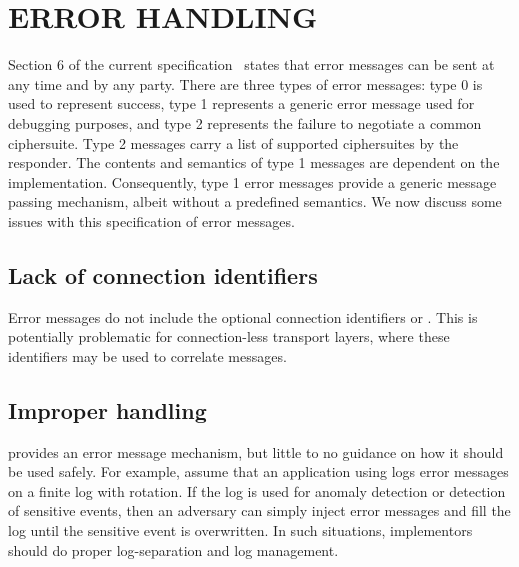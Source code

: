 \documentclass[runningheads]{llncs}
\begin{document}
\section{\uppercase{Error handling}}
\label{sec:errorHandling}
Section 6 of the current \mEdhoc{} specification~\cite{draft-ietf-lake-edhoc-15} states that error messages can be sent at any time and by any party.
%
There are three types of error messages: type 0 is used to represent success, type 1 represents a generic error message used for debugging purposes, and type 2 represents the failure to negotiate a common ciphersuite. 
%
Type 2 messages carry a list of supported ciphersuites by the responder.
%
The contents and semantics of type 1 messages are dependent on the implementation.
%
Consequently, type 1 error messages provide a generic message passing mechanism, albeit without a predefined semantics.
%
We now discuss some issues with this specification of error messages.

\subsection{Lack of connection identifiers}
Error messages do not include the optional connection identifiers \mCi{} or \mCr{}.
%
This is potentially problematic for connection-less transport layers, where these identifiers may be used to correlate messages.

\subsection{Improper handling}
\mEdhoc{} provides an error message mechanism, but little to no guidance on how it should be used safely.
%
For example, assume that an application using \mEdhoc{} logs error messages on a finite log with rotation.
%
If the log is used for anomaly detection or detection of sensitive events, then an adversary can simply inject error messages and fill the log until the sensitive event is overwritten.
%
In such situations, implementors should do proper log-separation and log management.
\end{document}
